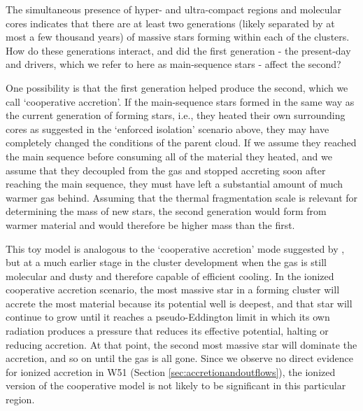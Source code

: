 \documentclass[twocolumn]{aastex61}
\begin{document}
The simultaneous presence of hyper- and ultra-compact \hii regions and
molecular cores indicates that there are at least two generations (likely
separated by at most a few thousand years) of massive stars forming within each
of the clusters.  How do these generations interact, and did the first
generation - the present-day \hchii and \uchii drivers, which we refer to here
as main-sequence stars - affect the second?

One possibility is that the first generation helped produce the second,
which we call `cooperative accretion'.
If the main-sequence stars formed in the same way as the current generation of
forming stars, i.e., they heated their own surrounding cores as suggested in
the `enforced isolation' scenario above, they may have completely changed the
conditions of the parent cloud.  If we assume they reached the main sequence
before consuming all of the material they heated, and we assume that they
decoupled from the gas and stopped accreting soon after reaching the main
sequence, they must have left a substantial amount of much warmer gas behind.
Assuming that the thermal fragmentation scale is relevant for determining
the mass of new stars, the second generation would form from warmer material
and would therefore be higher mass than the first.


This toy model is analogous to the `cooperative accretion' mode suggested by
\citet{Zinnecker2007a}, but at a much earlier stage in the cluster development
when the gas is still molecular and dusty and therefore capable of efficient
cooling.  In the ionized cooperative accretion scenario, the most massive star
in a forming cluster will accrete the most material because its potential well
is deepest, and that star will continue to grow until it reaches a
pseudo-Eddington limit in which its own radiation produces a pressure that
reduces its effective potential, halting or reducing accretion.  At that point,
the second most massive star will dominate the accretion, and so on until the
gas is all gone.  Since we observe no direct evidence for ionized accretion in
W51 (Section \ref{sec:accretionandoutflows}), the ionized version of the
cooperative model is not likely to be significant in this particular region.
\end{document}
